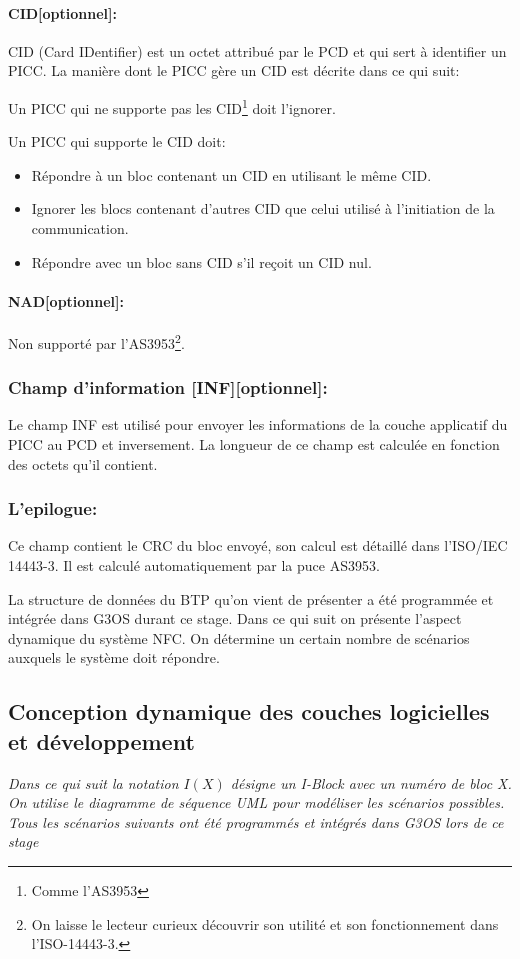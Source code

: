 \documentclass{themeensg}
\begin{document}
\paragraph{CID[optionnel]:}
CID (Card IDentifier) est un octet attribué par le PCD et qui sert à identifier un PICC. La manière dont le PICC gère un CID est décrite dans ce qui suit:

Un PICC qui ne supporte pas les CID\footnote{Comme l'AS3953} doit l'ignorer.

Un PICC qui supporte le CID doit:
\begin{itemize}
\item Répondre à un bloc contenant un CID en utilisant le même CID.
\item Ignorer les blocs contenant d'autres CID que celui utilisé à l'initiation de la communication.
\item Répondre avec un bloc sans CID s'il reçoit un CID nul.
\end{itemize}

\paragraph{NAD[optionnel]:}

Non supporté par l'AS3953\footnote{On laisse le lecteur curieux découvrir son utilité et son fonctionnement dans l'ISO-14443-3.}.

\subsubsection{Champ d'information [INF][optionnel]:}

Le champ INF est utilisé pour envoyer les informations de la couche applicatif du PICC au PCD et inversement. La longueur de ce champ est calculée  en fonction des octets qu'il contient.

\subsubsection{L'epilogue:}
Ce champ contient le CRC du bloc envoyé, son calcul est détaillé dans l'ISO/IEC 14443-3. Il est calculé automatiquement par la puce AS3953.

La structure de données du BTP qu'on vient de présenter a été programmée et intégrée dans G3OS durant ce stage. Dans ce qui suit on présente l'aspect dynamique du système NFC. On détermine un certain nombre de scénarios auxquels le système doit répondre. 

\subsection{Conception dynamique des couches logicielles et développement}
\textit{ Dans ce qui suit la notation $I(X)$ désigne un I-Block avec un numéro de bloc X. On utilise le diagramme de séquence UML pour modéliser les scénarios possibles. Tous les scénarios suivants ont été programmés et intégrés dans G3OS lors de ce stage}
\end{document}
